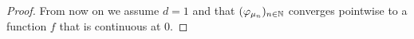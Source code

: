 \begin{proof}[Proof]
From now on we assume $d=1$ and that $(\varphi_{\mu_n})_{n\in\mathbb{N}}$ converges pointwise to a function $f$ that is continuous at $0$. 
				

\end{proof}
